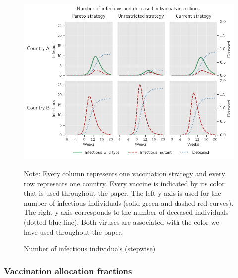 \begin{figure}[h!]
\centering
\includegraphics[scale=0.6]{images/piecewise_infectious_dead.png}\\
\begin{flushleft}
\scriptsize{Note:} Every column represents one vaccination strategy and every row represents one country. Every vaccine is indicated by its color that is used throughout the paper. The left y-axis is used for the number of infectious individuals (solid green and dashed red curves). The right y-axis corresponds to the number of deceased individuals (dotted blue line). Both viruses are associated with the color we have used throughout the paper. 
\end{flushleft}
\caption{Number of infectious individuals (stepwise)}
\label{fig:results_piecewise_infectious_dead}
\end{figure}

\clearpage
\subsubsection{Vaccination allocation fractions}
\label{A:fractions}

